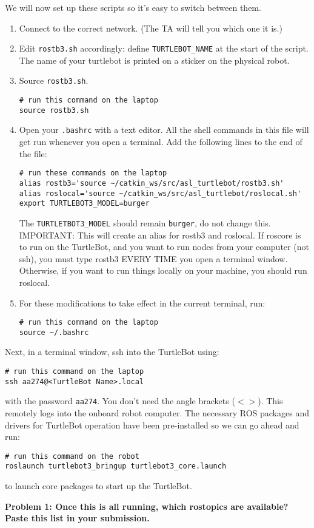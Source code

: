 We will now set up these scripts so it's easy to switch between them.
\begin{enumerate}
	\item Connect to the correct network. (The TA will tell you which one it is.)
	\item Edit \texttt{rostb3.sh} accordingly: define \texttt{TURTLEBOT\_NAME} at the start of the script. The name of your turtlebot is printed on a sticker on the physical robot.
	\item Source \texttt{rostb3.sh}.
	\begin{lstlisting}
# run this command on the laptop
source rostb3.sh
	\end{lstlisting}
	\item Open your \texttt{.bashrc} with a text editor. All the shell commands in this file will get run whenever you open a terminal.
	Add the following lines to the end of the file:
	\begin{lstlisting}
# run these commands on the laptop
alias rostb3='source ~/catkin_ws/src/asl_turtlebot/rostb3.sh'
alias roslocal='source ~/catkin_ws/src/asl_turtlebot/roslocal.sh'
export TURTLEBOT3_MODEL=burger
	\end{lstlisting}
	The \texttt{TURTLETBOT3\_MODEL} should remain \texttt{burger}, do not change this.
	IMPORTANT: This will create an alias for rostb3 and roslocal. If roscore is to run on the TurtleBot, and you want to run nodes from your computer (not ssh), you must type rostb3 EVERY TIME you open a terminal window. Otherwise, if you want to run things locally on your machine, you should run roslocal.
	\item For these modifications to take effect in the current terminal, run:
	\begin{lstlisting}
# run this command on the laptop
source ~/.bashrc
	\end{lstlisting}
\end{enumerate}

Next, in a terminal window, ssh into the TurtleBot using:
\begin{lstlisting}
# run this command on the laptop
ssh aa274@<TurtleBot Name>.local
\end{lstlisting}

with the password \texttt{aa274}. You don't need the angle brackets ($<>$). This remotely logs into the onboard robot computer. The necessary ROS packages
and drivers for TurtleBot operation have been pre-installed so we can go ahead and run:

\begin{lstlisting}
# run this command on the robot
roslaunch turtlebot3_bringup turtlebot3_core.launch	
\end{lstlisting}

to launch core packages to start up the TurtleBot.

{\bf Problem 1: Once this is all running, which rostopics are available? Paste this list in your submission.}
